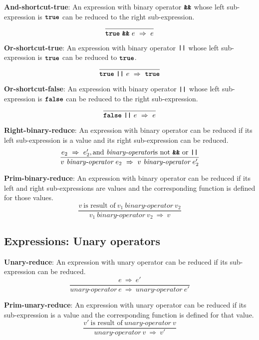 \vspace{10mm}
\textbf{And-shortcut-true}: An expression with binary operator
$\textbf{\texttt{\&\&}}$ whose left sub-expression is
$\textbf{\texttt{true}}$ can be reduced to
the right sub-expression.
\[
\frac{
}{
  \textbf{\texttt{true}}\  \textbf{\texttt{\&\&}}\ e
  \ \Rightarrow \ 
  e
}
\]

\vspace{10mm}
\textbf{Or-shortcut-true}: An expression with binary operator
$\textbf{\texttt{||}}$ whose left sub-expression is
$\textbf{\texttt{true}}$ can be reduced to
$\textbf{\texttt{true}}$.
\[
\frac{
}{
  \textbf{\texttt{true}}\  \textbf{\texttt{||}}\ e
  \ \Rightarrow \ 
  \textbf{\texttt{true}}
}
\]

\vspace{10mm}
\textbf{Or-shortcut-false}: An expression with binary operator
$\textbf{\texttt{||}}$ whose left sub-expression is
$\textbf{\texttt{false}}$ can be reduced to
the right sub-expression.
\[
\frac{
}{
  \textbf{\texttt{false}}\  \textbf{\texttt{||}}\ e
  \ \Rightarrow \ 
  e
}
\]

\vspace{10mm}
\textbf{Right-binary-reduce}: An expression with binary operator
can be reduced if its left sub-expression is a value and its right
sub-expression can be reduced.
\[
\frac{
  e_2\ \Rightarrow\ e_2', \textrm{and}\ \textit{binary-operator}
  \mbox{is not}\ \textbf{\texttt{\&\&}}\ \textrm{or}\ \texttt{\textbf{||}}
}{
  v\  \textit{binary-operator} \ e_2
  \ \Rightarrow \ 
  v\  \textit{binary-operator} \ e_2'
}
\]

\vspace{10mm}
\textbf{Prim-binary-reduce}: An expression with binary operator
can be reduced if its left and right sub-expressions are values and
the corresponding function is defined for those values.
\[
\frac{
  v\ \mbox{is result of}\ v_1\  \textit{binary-operator} \ v_2
}{
  v_1\  \textit{binary-operator} \ v_2
  \ \Rightarrow \ 
  v
}
\]

\subsection*{Expressions: Unary operators}

\textbf{Unary-reduce}: An expression with unary operator
can be reduced if its sub-expression can be reduced.
\[
\frac{
  e \ \Rightarrow \ e'
}{
  \textit{unary-operator} \ e
  \ \Rightarrow \ 
  \textit{unary-operator} \ e'
}
\]

\vspace{10mm}
\textbf{Prim-unary-reduce}: An expression with unary operator
can be reduced if its sub-expression is a value and
the corresponding function is defined for that value.
\[
\frac{
  v'\ \mbox{is result of}\ \textit{unary-operator} \ v
}{
  \textit{unary-operator} \ v
  \ \Rightarrow \ 
  v'
}
\]

